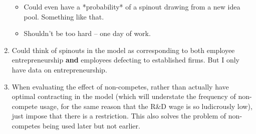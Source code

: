\documentclass[12pt,english]{article}
\theoremstyle{remark}
\begin{document}
\begin{enumerate}
\begin{itemize}
		\item Could even have a *probability* of a spinout drawing from a new idea pool. Something like that. 
		\item Shouldn't be too hard -- one day of work. 
	\end{itemize}
	\item Could think of spinouts in the model as corresponding to both employee entrepreneurship \textbf{and} employees defecting to established firms. But I only have data on entrepreneurship. 
	\item When evaluating the effect of non-competes, rather than actually have optimal contracting in the model (which will understate the frequency of non-compete usage, for the same reason that the R\&D wage is so ludicrously low), just impose that there is a restriction. This also solves the problem of non-competes being used later but not earlier.
\end{enumerate}
\end{document}
